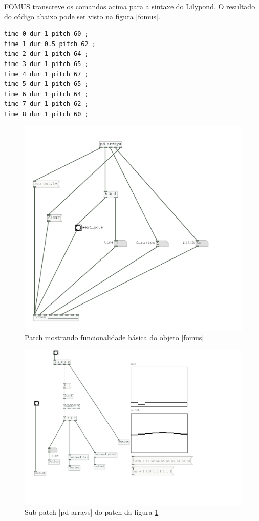 \documentclass{ppgmus}
\begin{document}
FOMUS transcreve os comandos acima para a sintaxe do Lilypond.
O resultado do código abaixo pode ser visto na figura \ref{fomus}.

\singlespacing
\footnotesize
\begin{verbatim}
time 0 dur 1 pitch 60 ;
time 1 dur 0.5 pitch 62 ;
time 2 dur 1 pitch 64 ;
time 3 dur 1 pitch 65 ;
time 4 dur 1 pitch 67 ;
time 5 dur 1 pitch 65 ;
time 6 dur 1 pitch 64 ;
time 7 dur 1 pitch 62 ;
time 8 dur 1 pitch 60 ;
\end{verbatim}
\normalsize
\doublespacing

\begin{figure}
\includegraphics[scale=.6]{sinc-fomus}
\caption{Patch mostrando funcionalidade básica do objeto [fomus]}
\label{sinc-fomus}
\end{figure}


\begin{figure}
\includegraphics[scale=.6]{sinc-fomus-array}
\caption{Sub-patch [pd arrays] do patch da figura \ref{sinc-fomus}}
\label{sinc-fomus-array}
\end{figure}
\end{document}
